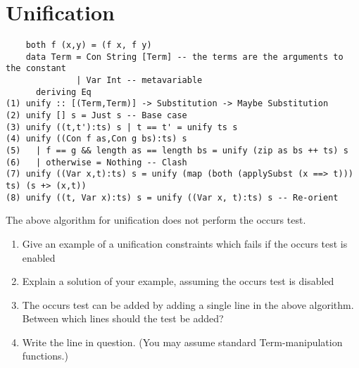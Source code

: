 \documentclass{article}
\begin{document}
\section{Unification}

\begin{verbatim}
    both f (x,y) = (f x, f y)
    data Term = Con String [Term] -- the terms are the arguments to the constant
              | Var Int -- metavariable
      deriving Eq
(1) unify :: [(Term,Term)] -> Substitution -> Maybe Substitution
(2) unify [] s = Just s -- Base case
(3) unify ((t,t'):ts) s | t == t' = unify ts s
(4) unify ((Con f as,Con g bs):ts) s
(5)   | f == g && length as == length bs = unify (zip as bs ++ ts) s
(6)   | otherwise = Nothing -- Clash
(7) unify ((Var x,t):ts) s = unify (map (both (applySubst (x ==> t))) ts) (s +> (x,t))
(8) unify ((t, Var x):ts) s = unify ((Var x, t):ts) s -- Re-orient
\end{verbatim}

The above algorithm for unification does not perform the occurs test.

\begin{enumerate}
\item Give an example of a unification constraints which fails if the
  occurs test is enabled 
\item Explain a solution of your example, assuming the occurs test is
  disabled 
\item The occurs test can be added by adding a single line in the
  above algorithm. Between which lines should the test be added?
\item Write the line in question. (You may assume standard
  Term-manipulation functions.) 
\end{enumerate}
\end{document}
